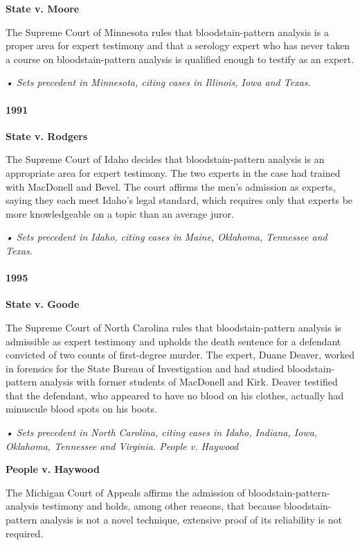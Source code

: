 \textbf{State v. Moore}

The Supreme Court of Minnesota rules that bloodstain-pattern analysis is
a proper area for expert testimony and that a serology expert who has
never taken a course on bloodstain-pattern analysis is qualified enough
to testify as an expert.

\emph{• Sets precedent in Minnesota, citing cases in Illinois, Iowa and
Texas.}

\hypertarget{1991}{%
\paragraph{1991}\label{1991}}

\textbf{State v. Rodgers}

The Supreme Court of Idaho decides that bloodstain-pattern analysis is
an appropriate area for expert testimony. The two experts in the case
had trained with MacDonell and Bevel. The court affirms the men's
admission as experts, saying they each meet Idaho's legal standard,
which requires only that experts be more knowledgeable on a topic than
an average juror.

\emph{• Sets precedent in Idaho, citing cases in Maine, Oklahoma,
Tennessee and Texas.}

\hypertarget{1995}{%
\paragraph{1995}\label{1995}}

\textbf{State v. Goode}

The Supreme Court of North Carolina rules that bloodstain-pattern
analysis is admissible as expert testimony and upholds the death
sentence for a defendant convicted of two counts of first-degree murder.
The expert, Duane Deaver, worked in forensics for the State Bureau of
Investigation and had studied bloodstain-pattern analysis with former
students of MacDonell and Kirk. Deaver testified that the defendant, who
appeared to have no blood on his clothes, actually had minuscule blood
spots on his boots.

\emph{• Sets precedent in North Carolina, citing cases in Idaho,
Indiana, Iowa, Oklahoma, Tennessee and Virginia. People v. Haywood}

\textbf{People v. Haywood}

The Michigan Court of Appeals affirms the admission of
bloodstain-pattern-analysis testimony and holds, among other reasons,
that because bloodstain-pattern analysis is not a novel technique,
extensive proof of its reliability is not required.

